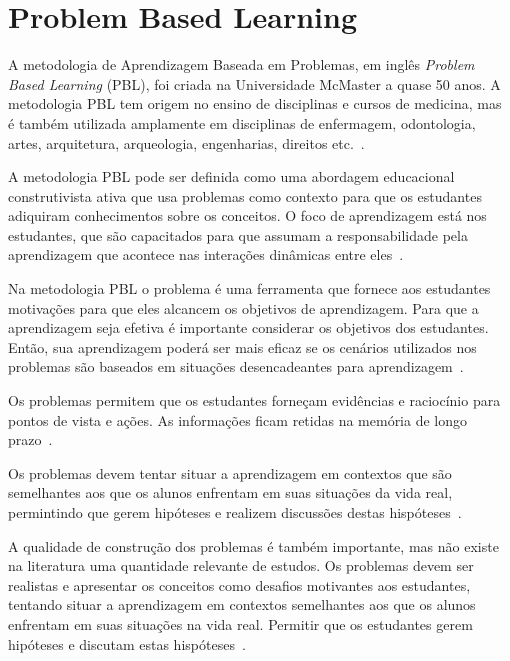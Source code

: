 \acresetall
\section{Problem Based Learning}

A metodologia de Aprendizagem Baseada em Problemas, em inglês \textit{Problem Based Learning} (PBL),
foi criada na Universidade McMaster a quase 50 anos.
A metodologia PBL tem origem no ensino de disciplinas e cursos de medicina, mas é também utilizada
amplamente em disciplinas de enfermagem,
odontologia, artes, arquitetura, arqueologia, engenharias, direitos
etc.~\cite{albanese2010problem, amos1998problem}.

A metodologia PBL pode ser definida como uma abordagem educacional
construtivista ativa que usa problemas como contexto para que os estudantes
adiquiram conhecimentos sobre os conceitos. O foco de aprendizagem está
nos estudantes, que são capacitados para que assumam a responsabilidade pela
aprendizagem que acontece nas interações dinâmicas
entre eles~\cite{dolmans2005problem, albanese2010problem, amos1998problem}.

Na metodologia PBL o problema é uma ferramenta que fornece
aos estudantes motivações para que eles alcancem os
objetivos de aprendizagem.
Para que a aprendizagem seja efetiva é importante considerar os objetivos
dos estudantes.
Então, sua aprendizagem poderá ser mais eficaz se os cenários utilizados
nos problemas são baseados em situações desencadeantes para
aprendizagem~\cite{wood2003problem, o2012practical, amos1998problem}.

Os problemas permitem que os estudantes forneçam evidências
e raciocínio para pontos de vista e ações.
As informações ficam retidas na memória de longo
prazo~\cite{azer2012twelve}.

Os problemas devem tentar situar a aprendizagem em contextos que
são semelhantes aos que os alunos enfrentam em suas situações
da vida real, permintindo que gerem hipóteses e realizem discussões
destas hispóteses~\cite{azer2012twelve}.

A qualidade de construção dos problemas é também importante,
mas não existe na literatura uma quantidade relevante
de estudos.
Os problemas devem ser realistas e apresentar os conceitos como
desafios motivantes aos estudantes, tentando situar a
aprendizagem em contextos semelhantes aos que os alunos
enfrentam em suas situações na vida real.
Permitir que os estudantes gerem hipóteses e discutam
estas hispóteses~\cite{albanese2010problem, azer2012twelve}.

